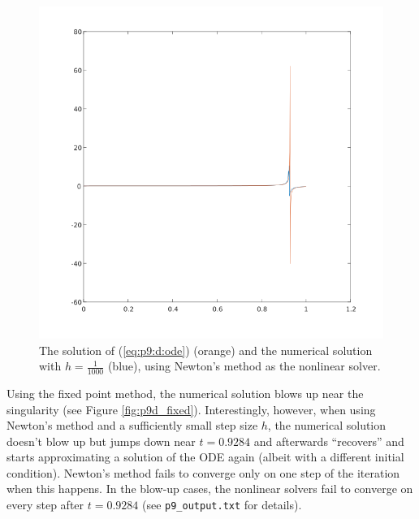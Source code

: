 \documentclass{homework}
\begin{document}
\begin{alphaparts}
			\begin{figure}[H]
				\centering
				\includegraphics[width=0.9\linewidth]{plot_p9d_h1000.png}
				\caption{The solution of (\ref{eq:p9:d:ode}) (orange) and the numerical solution with $h=\frac{1}{1000}$ (blue), using Newton's method as the nonlinear solver.}
				\label{fig:p9d_h1000}
			\end{figure}
			
			Using the fixed point method, the numerical solution blows up near the singularity (see Figure \ref{fig:p9d_fixed}). Interestingly, however, when using Newton's method and a sufficiently small step size $h$, the numerical solution doesn't blow up but jumps down near $t=0.9284$ and afterwards ``recovers'' and starts approximating a solution of the ODE again (albeit with a different initial condition). Newton's method fails to converge only on one step of the iteration when this happens. In the blow-up cases, the nonlinear solvers fail to converge on every step after $t=0.9284$ (see \verb*|p9_output.txt| for details).
			

\end{alphaparts}
\end{document}
